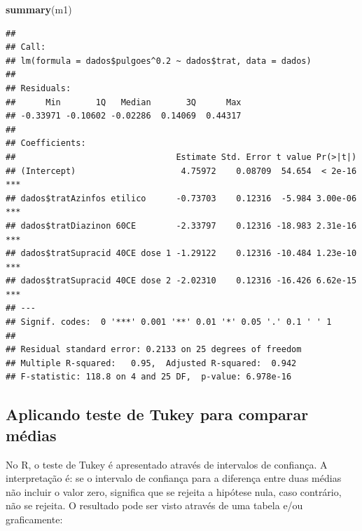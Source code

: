 \documentclass[
]{book}
\newenvironment{Shaded}{\begin{snugshade}}{\end{snugshade}}
\newcommand{\DataTypeTok}[1]{\textcolor[rgb]{0.13,0.29,0.53}{#1}}
\newcommand{\FloatTok}[1]{\textcolor[rgb]{0.00,0.00,0.81}{#1}}
\newcommand{\KeywordTok}[1]{\textcolor[rgb]{0.13,0.29,0.53}{\textbf{#1}}}
\newcommand{\NormalTok}[1]{#1}
\newcommand{\OperatorTok}[1]{\textcolor[rgb]{0.81,0.36,0.00}{\textbf{#1}}}
\newcommand{\StringTok}[1]{\textcolor[rgb]{0.31,0.60,0.02}{#1}}
\begin{document}
\begin{Shaded}
\begin{Highlighting}[]
\KeywordTok{summary}\NormalTok{(m1)}
\end{Highlighting}
\end{Shaded}

\begin{verbatim}
## 
## Call:
## lm(formula = dados$pulgoes^0.2 ~ dados$trat, data = dados)
## 
## Residuals:
##      Min       1Q   Median       3Q      Max 
## -0.33971 -0.10602 -0.02286  0.14069  0.44317 
## 
## Coefficients:
##                                Estimate Std. Error t value Pr(>|t|)    
## (Intercept)                     4.75972    0.08709  54.654  < 2e-16 ***
## dados$tratAzinfos etilico      -0.73703    0.12316  -5.984 3.00e-06 ***
## dados$tratDiazinon 60CE        -2.33797    0.12316 -18.983 2.31e-16 ***
## dados$tratSupracid 40CE dose 1 -1.29122    0.12316 -10.484 1.23e-10 ***
## dados$tratSupracid 40CE dose 2 -2.02310    0.12316 -16.426 6.62e-15 ***
## ---
## Signif. codes:  0 '***' 0.001 '**' 0.01 '*' 0.05 '.' 0.1 ' ' 1
## 
## Residual standard error: 0.2133 on 25 degrees of freedom
## Multiple R-squared:   0.95,  Adjusted R-squared:  0.942 
## F-statistic: 118.8 on 4 and 25 DF,  p-value: 6.978e-16
\end{verbatim}

\hypertarget{aplicando-teste-de-tukey-para-comparar-muxe9dias}{%
\subsection{Aplicando teste de Tukey para comparar médias}\label{aplicando-teste-de-tukey-para-comparar-muxe9dias}}

No R, o teste de Tukey é apresentado através de intervalos de confiança. A interpretação é: se o intervalo de confiança para a diferença entre duas médias não incluir o valor zero, significa que se rejeita a hipótese nula, caso contrário, não se rejeita. O resultado pode ser visto através de uma tabela e/ou graficamente:

\begin{Shaded}
\end{Shaded}
\end{document}
